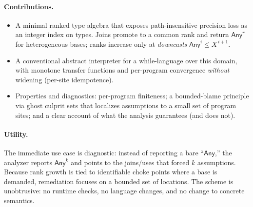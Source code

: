 \paragraph{Contributions.}
\begin{itemize}
  \item A minimal ranked type algebra that exposes path-insensitive precision loss as an integer index on types. Joins promote to a common rank and return \(\mathsf{Any}^{r}\) for heterogeneous bases; ranks increase only at \emph{downcasts} \(\mathsf{Any}^{i}\le X^{\,i+1}\).
  \item A conventional abstract interpreter for a while-language over this domain, with monotone transfer functions and per-program convergence \emph{without} widening (per-site idempotence).
  \item Properties and diagnostics: per-program finiteness; a bounded-blame principle via ghost culprit sets that localizes assumptions to a small set of program sites; and a clear account of what the analysis guarantees (and does not).
\end{itemize}

\paragraph{Utility.}
The immediate use case is diagnostic: instead of reporting a bare ``\(\mathsf{Any}\),'' the analyzer reports \(\mathsf{Any}^{k}\) and points to the joins/uses that forced \(k\) assumptions.
Because rank growth is tied to identifiable choke points where a base is demanded, remediation focuses on a bounded set of locations.
The scheme is unobtrusive: no runtime checks, no language changes, and no change to concrete semantics.
